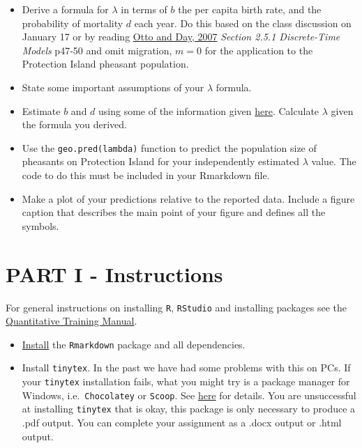 \documentclass[
]{book}
\providecommand{\tightlist}{%
  \setlength{\itemsep}{0pt}\setlength{\parskip}{0pt}}
\begin{document}
\begin{itemize}
\item
  Derive a formula for \(\lambda\) in terms of \(b\) the per capita birth rate, and the probability of mortality \(d\) each year. Do this based on the class discussion on January 17 or by reading \href{https://ebookcentral.proquest.com/lib/mun/reader.action?docID=768551\&ppg=29}{Otto and Day, 2007} \emph{Section 2.5.1 Discrete-Time Models} p47-50 and omit migration, \(m=0\) for the application to the Protection Island pheasant population.
\item
  State some important assumptions of your \(\lambda\) formula.
\item
  Estimate \(b\) and \(d\) using some of the information given \protect\hyperlink{pheasant}{here}. Calculate \(\lambda\) given the formula you derived.
\item
  Use the \texttt{geo.pred(lambda)} function to predict the population size of pheasants on Protection Island for your independently estimated \(\lambda\) value. The code to do this must be included in your Rmarkdown file.
\item
  Make a plot of your predictions relative to the reported data. Include a figure caption that describes the main point of your figure and defines all the symbols.
\end{itemize}

\hypertarget{partI}{%
\chapter*{PART I - Instructions}\label{partI}}

For general instructions on installing \texttt{R}, \texttt{RStudio} and installing packages see the \href{https://ahurford.github.io/quant-guide-all-courses/}{Quantitative Training Manual}.

\begin{itemize}
\tightlist
\item
  \href{https://ahurford.github.io/quant-guide-all-courses/install.html}{Install} the \texttt{Rmarkdown} package and all dependencies.
\item
  Install \texttt{tinytex}. In the past we have had some problems with this on PCs. If your \texttt{tinytex} installation fails, what you might try is a package manager for Windows, i.e.~\texttt{Chocolatey} or \texttt{Scoop}. See \href{https://github.com/rstudio/tinytex-releases}{here} for details. You are unsuccessful at installing \texttt{tinytex} that is okay, this package is only necessary to produce a .pdf output. You can complete your assignment as a .docx output or .html output.
\end{itemize}
\end{document}
